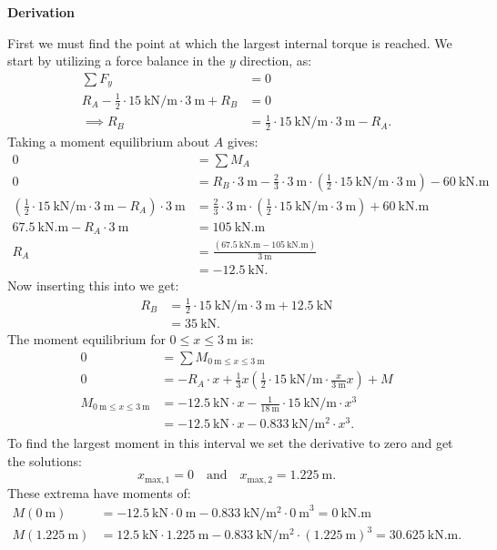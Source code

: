 \documentclass[a4paper]{article}
\numberwithin{equation}{problem}
\newcommand{\AUheading}[1]{%
  \par\vspace{.4\baselineskip}%
  {\sffamily\bfseries\color{AUblueDark}#1\par}%
  \nobreak%
}
\newenvironment{derivation}[1][Derivation]{%
  \AUheading{#1}
  \begingroup\allowdisplaybreaks
  \setlength{\abovedisplayskip}{6pt}%
  \setlength{\belowdisplayskip}{6pt}%
  \setlength{\abovedisplayshortskip}{4pt}%
  \setlength{\belowdisplayshortskip}{4pt}%
}{\par\endgroup\medskip}
\begin{document}
\begin{derivation}
  First we must find the point at which the largest internal torque is reached.
  We start by utilizing a force balance in the $y$ direction, as:
  \begin{align} \label{eq:p11701}
    \sum F_y &= 0 \nonumber \\
    R_A - \frac{1}{2} \cdot \qty{15}{\kN\per\m} \cdot \qty{3}{\m} + R_B &= 0 \nonumber \\
    \implies R_B &= \frac{1}{2} \cdot \qty{15}{\kN\per\m} \cdot \qty{3}{\m} - R_A
  .\end{align}
  Taking a moment equilibrium about $A$ gives:
  \begin{align*}
    0 &= \sum M_A \\
    0 &= R_B \cdot \qty{3}{\m} - \frac{2}{3} \cdot \qty{3}{\m} \cdot \left( \frac{1}{2} \cdot \qty{15}{\kN\per\m} \cdot \qty{3}{\m}  \right) - \qty{60}{\kN.\m} \\
    \left( \frac{1}{2} \cdot \qty{15}{\kN\per\m} \cdot \qty{3}{\m} - R_A \right) \cdot \qty{3}{\m} &= \frac{2}{3} \cdot \qty{3}{\m} \cdot \left( \frac{1}{2} \cdot \qty{15}{\kN\per\m} \cdot \qty{3}{\m}  \right) + \qty{60}{\kN.\m}  \\
    \qty{67,5}{\kN.\m} - R_A \cdot \qty{3}{\m} &= \qty{105}{\kN.\m} \\
    R_A &= \frac{\left( \qty{67,5}{\kN.\m} - \qty{105}{\kN.\m} \right)}{\qty{3}{\m}} \\
        &= \qty{-12,5}{\kN} 
  .\end{align*}
  Now inserting this into  we get:
  \begin{align*}
    R_B &= \frac{1}{2} \cdot \qty{15}{\kN\per\m} \cdot \qty{3}{\m} + \qty{12,5}{\kN}  \\
        &= \qty{35}{\kN} 
  .\end{align*}
  The moment equilibrium for $0 \leq x \leq \qty{3}{\m} $ is:
  \begin{align*}
    0 &=\sum M_{\qty{0}{\m}  \leq x \leq \qty{3}{\m}} \\
    0 &=- R_A \cdot x + \frac{1}{3} x \left( \frac{1}{2} \cdot \qty{15}{\kN\per\m} \cdot \frac{x}{\qty{3}{\m}}x \right) + M  \\
    M_{\qty{0}{\m}  \leq x \leq \qty{3}{\m}} &= \qty{-12,5}{\kN} \cdot x - \frac{1}{\qty{18}{\m}} \cdot \qty{15}{\kN\per\m}  \cdot x^3 \\
                                  &= \qty{-12,5}{\kN} \cdot x - \qty{0,833}{\kN\per\square\m} \cdot x^3
  .\end{align*}
  To find the largest moment in this interval we set the derivative to zero and get the solutions:
  \[ 
  x_{\mathrm{max},1} = 0 \quad \text{and} \quad x_{\mathrm{max}, 2} = \qty{1,225}{\m}
  .\]
  These extrema have moments of:
  \begin{align*}
    M(\qty{0}{\m}) &= \qty{-12,5}{\kN} \cdot \qty{0}{\m} - \qty{0,833}{\kN\per\square\m} \cdot \qty{0}{\m}^3 = \qty{0}{\kN.\m} \\
    M \left( \qty{1,225}{\m}  \right)&= \qty{12,5}{\kN} \cdot \qty{1,225}{\m} - \qty{0,833}{\kN\per\square\m} \cdot \left( \qty{1,225}{\m}  \right)^3 = \qty{30,625}{\kN.\m} 
  .\end{align*}


\end{derivation}
\end{document}
